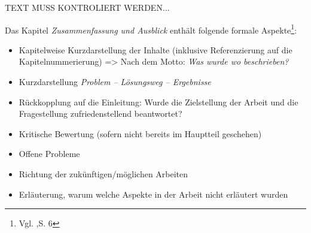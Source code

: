 TEXT MUSS KONTROLIERT WERDEN...\\

\newpage
\vspace{1cm}
\begin{tcolorbox}[title={Inhalte der \textit{Zusammenfassung und Ausblick}}]
  Das Kapitel \textit{Zusammenfassung und Ausblick} enthält folgende formale Aspekte\footnote{Vgl. \cite{BBoJ},S. 6}:
  \begin{itemize}
    \item Kapitelweise Kurzdarstellung der Inhalte (inklusive Referenzierung auf die Kapitelnummerierung) => Nach dem Motto: \textit{Was wurde wo beschrieben?}
    \item Kurzdarstellung \textit{Problem – Lösungsweg – Ergebnisse}
    \item Rückkopplung auf die Einleitung: Wurde die Zielstellung der Arbeit und die Fragestellung zufriedenstellend beantwortet?
    \item Kritische Bewertung (sofern nicht bereits im Hauptteil geschehen)
    \item Offene Probleme
    \item Richtung der zukünftigen/möglichen Arbeiten
    \item Erläuterung, warum welche Aspekte in der Arbeit nicht erläutert wurden
  \end{itemize}
\end{tcolorbox}